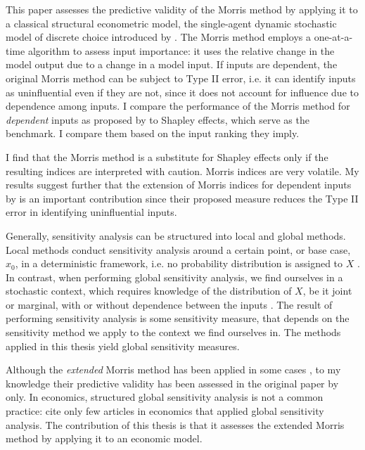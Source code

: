 
This paper assesses the predictive validity of the Morris method by applying it to a classical structural econometric model, the single-agent dynamic stochastic model of discrete choice introduced by \citet{R87}. The Morris method employs a one-at-a-time algorithm to assess input importance: it uses the relative change in the model output due to a change in a model input. If inputs are dependent, the original Morris method can be subject to Type II error, i.e. it can identify inputs as uninfluential even if they are not, since it does not account for influence due to dependence among inputs. I compare the performance of the Morris method for \textit{dependent} inputs as proposed by \citet{GM17} to Shapley effects, which serve as the benchmark. I compare them based on the input ranking they imply.

I find that the Morris method is a substitute for Shapley effects only if the resulting indices are interpreted with caution. Morris indices are very volatile. %
My results suggest further that the extension of Morris indices for dependent inputs by \citet{GM17} is an important contribution since their proposed measure reduces the Type II error in identifying uninfluential inputs.

Generally, sensitivity analysis can be structured into local and global methods. Local methods conduct sensitivity analysis around a certain point, or base case, $x_0$, in a deterministic framework, i.e. no probability distribution is assigned to $X$ \citep{BP16}. In contrast, when performing global sensitivity analysis, we find ourselves in a stochastic context, which requires knowledge of the distribution of $X$, be it joint or marginal, with or without dependence between the inputs \citep{ST02}. The result of performing sensitivity analysis is some sensitivity measure, that depends on the sensitivity method we apply to the context we find ourselves in. The methods applied in this thesis yield global sensitivity measures.

Although the \textit{extended} Morris method has been applied in some cases \citep[e.g.][]{MMA18, RZY19}, to my knowledge their predictive validity has been assessed in the original paper by \citet{GM17} only. In economics, structured global sensitivity analysis is not a common practice: \citet{HMSW19} cite only few articles in economics that applied global sensitivity analysis. The contribution of this thesis is that it assesses the extended Morris method by applying it to an economic model.

